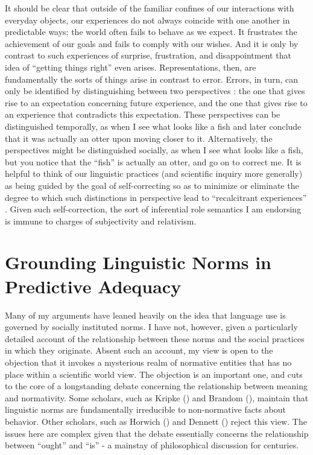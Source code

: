 It should be clear that outside of the familiar confines of our interactions with everyday objects, our experiences do not always coincide with one another in predictable ways; the world often fails to behave as we expect. It frustrates the achievement of our goals and fails to comply with our wishes. And it is only by contrast to such experiences of surprise, frustration, and disappointment that idea of ``getting things right'' even arises. Representations, then, are fundamentally the sorts of things arise in contrast to error. Errors, in turn, can only be identified by distinguishing between two perspectives \citep{Brandom:1994}: the one that gives rise to an expectation concerning future experience, and the one that gives rise to an experience that contradicts this expectation. These perspectives can be distinguished temporally, as when I see what looks like a fish and later conclude that it was actually an otter upon moving closer to it. Alternatively, the perspectives might be distinguished socially, as when I see what looks like a fish, but you notice that the ``fish'' is actually an otter, and go on to correct me. It is helpful to think of our linguistic practices (and scientific inquiry more generally) as being guided by the goal of self-correcting so as to minimize or eliminate the degree to which such distinctions in perspective lead to ``recalcitrant experiences'' \citep{Misak:2013}. Given such self-correction, the sort of inferential role semantics I am endorsing is immune to charges of subjectivity and relativism. 

\section{Grounding Linguistic Norms in Predictive Adequacy}

Many of my arguments have leaned heavily on the idea that language use is governed by socially instituted norms. I have not, however, given a particularly detailed account of the relationship between these norms and the social practices in which they originate. Absent such an account, my view is open to the objection that it invokes a mysterious realm of normative entities that has no place within a scientific world view. The objection is an important one, and cuts to the core of a longstanding debate concerning the relationship between meaning and normativity. Some scholars, such as Kripke (\citeyear{Kripke:1982}) and Brandom (\citeyear{Brandom:1994}), maintain that linguistic norms are fundamentally irreducible to non-normative facts about behavior. Other scholars, such as Horwich (\citeyear{Horwich:2005}) and Dennett (\citeyear{Dennett:2010,Dennett:1987}) reject this view. The issues here are complex given that the debate essentially concerns the relationship between ``ought'' and ``is'' - a mainstay of philosophical discussion for centuries. 

